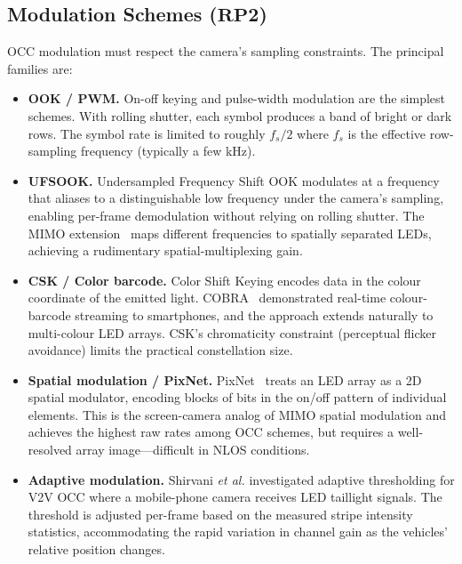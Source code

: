 \documentclass[10pt,a4paper]{article}
\newcommand{\rp}[1]{\textbf{RP#1}}
\begin{document}
\subsection{Modulation Schemes ($\rp{2}$)}
\label{sec:rp2}

OCC modulation must respect the camera's sampling constraints. The
principal families are:

\begin{itemize}
  \item \textbf{OOK / PWM.} On-off keying and pulse-width modulation are
    the simplest schemes. With rolling shutter, each symbol produces a
    band of bright or dark rows. The symbol rate is limited to roughly
    $f_s / 2$ where $f_s$ is the effective row-sampling frequency
    (typically a few kHz).
  \item \textbf{UFSOOK.} Undersampled Frequency Shift OOK modulates at a
    frequency that aliases to a distinguishable low frequency under the
    camera's sampling, enabling per-frame demodulation without relying
    on rolling shutter. The MIMO extension~\cite{mimoufsook2013} maps
    different frequencies to spatially separated LEDs, achieving a
    rudimentary spatial-multiplexing gain.
  \item \textbf{CSK / Color barcode.} Color Shift Keying encodes data in
    the colour coordinate of the emitted light. COBRA~\cite{cobra2012}
    demonstrated real-time colour-barcode streaming to smartphones, and
    the approach extends naturally to multi-colour LED arrays. CSK's
    chromaticity constraint (perceptual flicker avoidance) limits the
    practical constellation size.
  \item \textbf{Spatial modulation / PixNet.} PixNet~\cite{pixnet2010}
    treats an LED array as a 2D spatial modulator, encoding blocks of
    bits in the on/off pattern of individual elements. This is the
    screen-camera analog of MIMO spatial modulation and achieves the
    highest raw rates among OCC schemes, but requires a well-resolved
    array image---difficult in NLOS conditions.
  \item \textbf{Adaptive modulation.} Shirvani \emph{et al.}
    \cite{shirvani2021adaptive} investigated adaptive thresholding for
    V2V OCC where a mobile-phone camera receives LED taillight signals.
    The threshold is adjusted per-frame based on the measured stripe
    intensity statistics, accommodating the rapid variation in channel
    gain as the vehicles' relative position changes.
\end{itemize}
\end{document}
